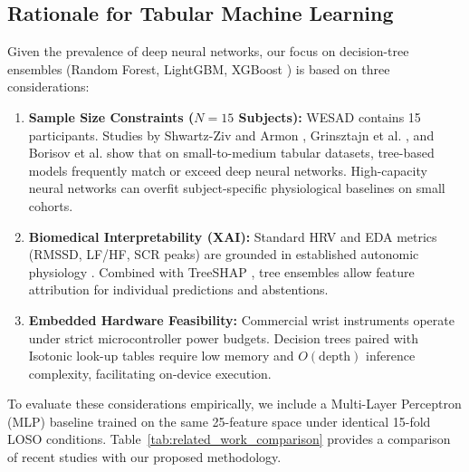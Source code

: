 \documentclass[conference]{IEEEtran}
\begin{document}
\subsection{Rationale for Tabular Machine Learning}
Given the prevalence of deep neural networks, our focus on decision-tree ensembles (Random Forest, LightGBM, XGBoost \cite{chen2016xgboost}) is based on three considerations:
\begin{enumerate}
    \item \textbf{Sample Size Constraints ($N=15$ Subjects):} WESAD contains 15 participants. Studies by Shwartz-Ziv and Armon \cite{shwartzziv2022tabular}, Grinsztajn et al. \cite{grinsztajn2022why}, and Borisov et al. \cite{borisov2024deep} show that on small-to-medium tabular datasets, tree-based models frequently match or exceed deep neural networks. High-capacity neural networks can overfit subject-specific physiological baselines on small cohorts.
    \item \textbf{Biomedical Interpretability (XAI):} Standard HRV and EDA metrics (RMSSD, LF/HF, SCR peaks) are grounded in established autonomic physiology \cite{taskforce1996heart, makowski2021neurokit2, boucsein2012electrodermal, tarvainen2014kubios}. Combined with TreeSHAP \cite{lundberg2020local}, tree ensembles allow feature attribution for individual predictions and abstentions.
    \item \textbf{Embedded Hardware Feasibility:} Commercial wrist instruments operate under strict microcontroller power budgets. Decision trees paired with Isotonic look-up tables require low memory and $O(\text{depth})$ inference complexity, facilitating on-device execution.
\end{enumerate}

To evaluate these considerations empirically, we include a Multi-Layer Perceptron (MLP) baseline trained on the same 25-feature space under identical 15-fold LOSO conditions. Table~\ref{tab:related_work_comparison} provides a comparison of recent studies with our proposed methodology.
\end{document}
